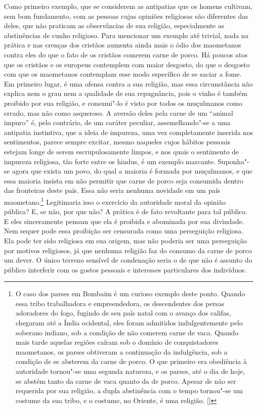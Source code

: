 Como primeiro exemplo, que se considerem as antipatias que os homens
cultivam, sem bom fundamento, com as pessoas cujas opiniões religiosas
são diferentes das deles, que não praticam as observâncias de sua religião,
especialmente as abstinências de cunho religioso. Para mencionar um
exemplo até trivial, nada na prática e nas crenças dos cristãos aumenta
ainda mais o ódio dos maometanos contra eles do que o fato de os cristãos
comerem carne de porco. Há poucos atos que os cristãos e os europeus
contemplem com maior desgosto, do que o desgosto com que os maometanos
contemplam esse modo específico de se saciar a fome. Em primeiro lugar,
é uma ofensa contra a sua religião, mas essa circunstância não explica
nem o grau nem a qualidade de sua repugnância, pois o vinho é também
proibido por sua religião, e consumi"-lo é visto por todos os
muçulmanos como errado, mas não como asqueroso. A aversão deles pela
carne de um ``animal impuro'' é, pelo contrário, de um caráter peculiar,
assemelhando"-se a uma antipatia instintiva, que a ideia de impureza,
uma vez completamente inserida nos sentimentos, parece sempre excitar,
mesmo naqueles cujos hábitos pessoais estejam longe de serem
escrupulosamente limpos, e nos quais o sentimento de impureza religiosa, tão forte
entre os hindus, é um exemplo marcante. Suponha"-se agora que exista um
povo, do qual a maioria é formada por muçulmanos, e que essa maioria
insista em não permitir que carne de porco seja consumida dentro das
fronteiras deste país. Essa não seria nenhuma novidade em um país
maometano.\footnote{ O caso dos parses em Bombaim é um curioso exemplo 
deste ponto. Quando essa tribo trabalhadora e empreendedora, os descendentes dos persas
adoradores do fogo, fugindo de seu país natal com o avanço dos califas,
chegaram até a Índia ocidental, eles foram admitidos indulgentemente
pelo soberano indiano, sob a condição de não comerem carne de vaca.
Quando mais tarde aquelas regiões caíram sob o domínio de
conquistadores maometanos, os parses obtiveram a continuação da
indulgência, sob a condição de se absterem da carne de porco. O que
primeiro era obediência à autoridade tornou"-se uma segunda natureza,
e os parses, até o dia de hoje, se abstém tanto da carne de vaca quanto
da de porco. Apesar de não ser requerida por sua religião, a dupla
abstinência com o tempo tornou"-se um costume da sua tribo, e o
costume, no Oriente, é uma religião. []}
 Legitimaria isso o exercício da autoridade moral da opinião pública? E,
se não, por que não? A prática é de fato revoltante para tal público. E
eles sinceramente pensam que ela é proibida e abominada por sua
divindade. Nem sequer pode essa proibição ser censurada como uma
perseguição religiosa. Ela pode ter sido religiosa em sua origem, mas
não poderia ser uma perseguição por motivos religiosos, já que nenhuma
religião faz do consumo da carne de porco um dever. O único
terreno sensível de condenação seria o de que não é assunto do público
interferir com os gostos pessoais e interesses particulares dos indivíduos. 

